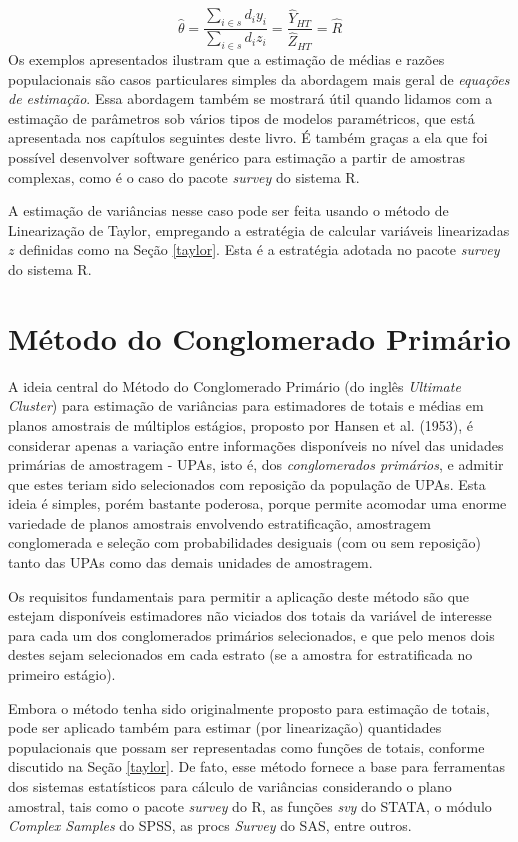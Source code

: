\documentclass[
  12pt,
  brazilian,
]{book}
\theoremstyle{definition}
\theoremstyle{definition}
\theoremstyle{definition}
\theoremstyle{definition}
\theoremstyle{remark}
\begin{document}
\[
\widehat \theta = \frac{\sum_{i \in s} d_i y_i}{\sum_{i \in s} d_i z_i} = \frac{\widehat{Y}_{HT}}{\widehat{Z}_{HT}} = \widehat{R}
\]
Os exemplos apresentados ilustram que a estimação de médias e razões populacionais são casos particulares simples da abordagem mais geral de \emph{equações de estimação}. Essa abordagem também se mostrará útil quando lidamos com a estimação de parâmetros sob vários tipos de modelos paramétricos, que está apresentada nos capítulos seguintes deste livro. É também graças a ela que foi possível desenvolver software genérico para estimação a partir de amostras complexas, como é o caso do pacote \emph{survey} do sistema R.

A estimação de variâncias nesse caso pode ser feita usando o método de Linearização de Taylor, empregando a estratégia de calcular variáveis linearizadas \(z\) definidas como na Seção \ref{taylor}. Esta é a estratégia adotada no pacote \emph{survey} do sistema R.

\hypertarget{muxe9todo-do-conglomerado-primuxe1rio}{%
\section{Método do Conglomerado Primário}\label{muxe9todo-do-conglomerado-primuxe1rio}}

A ideia central do Método do Conglomerado Primário (do inglês \emph{Ultimate Cluster}) para estimação de variâncias para estimadores de totais e médias em planos amostrais de múltiplos estágios, proposto por Hansen et al. (1953), é considerar apenas a variação entre informações disponíveis no nível das unidades primárias de amostragem - UPAs, isto é, dos \emph{conglomerados primários}, e admitir que estes teriam sido selecionados com reposição da população de UPAs. Esta ideia é simples, porém bastante poderosa, porque permite acomodar uma enorme variedade de planos amostrais envolvendo estratificação, amostragem conglomerada e seleção com probabilidades desiguais (com ou sem reposição) tanto das UPAs como das demais unidades de amostragem.

Os requisitos fundamentais para permitir a aplicação deste método são que estejam disponíveis estimadores não viciados dos totais da variável de interesse para cada um dos conglomerados primários selecionados, e que pelo menos dois destes sejam selecionados em cada estrato (se a amostra for estratificada no primeiro estágio).

Embora o método tenha sido originalmente proposto para estimação de totais, pode ser aplicado também para estimar (por linearização) quantidades populacionais que possam ser representadas como funções de totais, conforme discutido na Seção \ref{taylor}. De fato, esse método fornece a base para ferramentas dos sistemas
estatísticos para cálculo de variâncias considerando o plano amostral, tais como o pacote \emph{survey} do R, as funções \emph{svy} do STATA, o módulo \emph{Complex Samples} do SPSS, as procs \emph{Survey} do SAS, entre outros.
\end{document}
